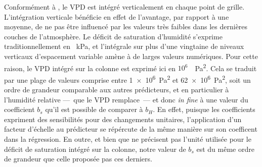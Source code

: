 \documentclass[../main.tex]{subfiles}
\begin{document}
Conformément à \textcite{camargo_testing_2014}, le VPD est intégré verticalement en chaque point de grille. L'intégration verticale bénéficie en effet de
l'avantage, par rapport à une moyenne, de ne pas être influencé par les valeurs très faibles dans les dernières couches de l'atmosphère. Le déficit de
saturation d'humidité s'exprime traditionnellement en \SI{}{\kilo\pascal}, et l'intégrale sur plus d'une vingtaine de niveaux verticaux d'espacement variable
amène à de larges valeurs numériques. Pour cette raison, le VPD intégré sur la colonne est exprimé ici en $10^6$~\SI{}{\pascal\squared}. Cela se traduit par une
plage de valeurs comprise entre \SI{1e6}{\pascal\squared} et \SI{62e6}{\pascal\squared}, soit un ordre de grandeur comparable aux autres prédicteurs, et en
particulier à l'humidité relative ---~que le VPD remplace~--- et donc \textit{in fine} à une valeur du coefficient $b_s$ qu'il est possible de comparer à $b_H$.
En effet, puisque les coefficients expriment des sensibilités pour des changements unitaires, l'application d'un facteur d'échelle au prédicteur se répércute de
la même manière sur son coefficent dans la régression. En outre, et bien que \textcite{camargo_testing_2014} ne précisent pas l'unité utilisée pour le déficit
de saturation intégré sur la colonne, notre valeur de $b_s$ est du même ordre de grandeur que celle proposée pas ces derniers.
\end{document}
